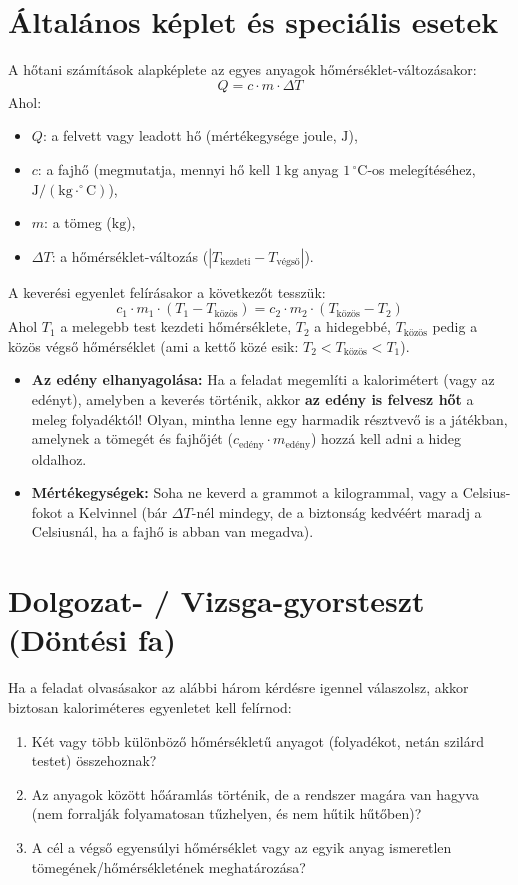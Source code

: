 \documentclass[11pt,a4paper]{article}
\begin{document}
\section{Általános képlet és speciális esetek}
A hőtani számítások alapképlete az egyes anyagok hőmérséklet-változásakor:
$$Q = c \cdot m \cdot \Delta T$$
Ahol:
\begin{itemize}
    \item $Q$: a felvett vagy leadott hő (mértékegysége joule, $\text{J}$),
    \item $c$: a fajhő (megmutatja, mennyi hő kell $1\,\text{kg}$ anyag $1\,^\circ\text{C}$-os melegítéséhez, $\text{J}/(\text{kg}\cdot^\circ\text{C})$),
    \item $m$: a tömeg ($\text{kg}$),
    \item $\Delta T$: a hőmérséklet-változás ($|T_{\text{kezdeti}} - T_{\text{végső}}|$).
\end{itemize}

A keverési egyenlet felírásakor a következőt tesszük:
$$c_1 \cdot m_1 \cdot (T_1 - T_{\text{közös}}) = c_2 \cdot m_2 \cdot (T_{\text{közös}} - T_2)$$
Ahol $T_1$ a melegebb test kezdeti hőmérséklete, $T_2$ a hidegebbé, $T_{\text{közös}}$ pedig a közös végső hőmérséklet (ami a kettő közé esik: $T_2 < T_{\text{közös}} < T_1$).

\begin{tcolorbox}[colframe=myalert, colback=red!5!white, title=Gyakori csapdák és speciális esetek]
\begin{itemize}
    \item \textbf{Az edény elhanyagolása:} Ha a feladat megemlíti a kalorimétert (vagy az edényt), amelyben a keverés történik, akkor \textbf{az edény is felvesz hőt} a meleg folyadéktól! Olyan, mintha lenne egy harmadik résztvevő is a játékban, amelynek a tömegét és fajhőjét ($c_{\text{edény}} \cdot m_{\text{edény}}$) hozzá kell adni a hideg oldalhoz.
    \item \textbf{Mértékegységek:} Soha ne keverd a grammot a kilogrammal, vagy a Celsius-fokot a Kelvinnel (bár $\Delta T$-nél mindegy, de a biztonság kedvéért maradj a Celsiusnál, ha a fajhő is abban van megadva).
\end{itemize}
\end{tcolorbox}

\section{Dolgozat- / Vizsga-gyorsteszt (Döntési fa)}
Ha a feladat olvasásakor az alábbi három kérdésre igennel válaszolsz, akkor biztosan kaloriméteres egyenletet kell felírnod:
\begin{enumerate}
    \item Két vagy több különböző hőmérsékletű anyagot (folyadékot, netán szilárd testet) összehoznak?
    \item Az anyagok között hőáramlás történik, de a rendszer magára van hagyva (nem forralják folyamatosan tűzhelyen, és nem hűtik hűtőben)?
    \item A cél a végső egyensúlyi hőmérséklet vagy az egyik anyag ismeretlen tömegének/hőmérsékletének meghatározása?
\end{enumerate}
\end{document}
